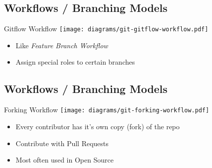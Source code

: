 \subsection{Workflows / Branching Models}
\begin{frame}[fragile]
  \subslidetitle
  Gitflow Workflow
  \center \texttt{[image: diagrams/git-gitflow-workflow.pdf]}

  \begin{itemize}
    \item Like \textit{Feature Branch Workflow}
    \item Assign special roles to certain branches
  \end{itemize}

\end{frame}

\subsection{Workflows / Branching Models}
\begin{frame}[fragile]
  \subslidetitle
  Forking Workflow
  \center \texttt{[image: diagrams/git-forking-workflow.pdf]}

  \vspace{2em}
  \begin{itemize}
    \item Every contributor has it's own copy (fork) of the repo
    \item Contribute with Pull Requests
    \item Most often used in Open Source
  \end{itemize}

\end{frame}
